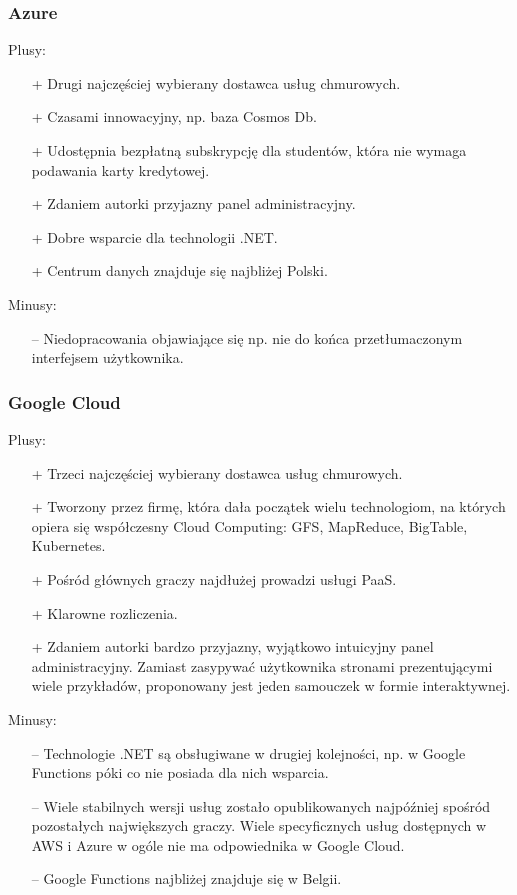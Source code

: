 \documentclass[12pt,a4paper,twoside,titlepage,openright]{book}
\begin{document}
\subsubsection{Azure}

Plusy:
\begin{itemize}
\item[+] Drugi najczęściej wybierany dostawca usług chmurowych.
\item[+] Czasami innowacyjny, np. baza Cosmos Db.
\item[+] Udostępnia bezpłatną subskrypcję dla studentów, która nie wymaga podawania karty kredytowej.
\item[+] Zdaniem autorki przyjazny panel administracyjny.
\item[+] Dobre wsparcie dla technologii .NET.
\item[+] Centrum danych znajduje się najbliżej Polski.
\end{itemize}

\noindent
Minusy:
\begin{itemize}
\item[--] Niedopracowania objawiające się np. nie do końca przetłumaczonym interfejsem użytkownika.
\end{itemize}

\subsubsection{Google Cloud}

Plusy:
\begin{itemize}
\item[+] Trzeci najczęściej wybierany dostawca usług chmurowych.
\item[+] Tworzony przez firmę, która dała początek wielu technologiom, na których opiera się współczesny Cloud Computing: GFS, MapReduce, BigTable, Kubernetes.
\item[+] Pośród głównych graczy najdłużej prowadzi usługi PaaS.
\item[+] Klarowne rozliczenia.
\item[+] Zdaniem autorki bardzo przyjazny, wyjątkowo intuicyjny panel administracyjny. Zamiast zasypywać użytkownika stronami prezentującymi wiele przykładów, proponowany jest jeden samouczek w formie interaktywnej.
\end{itemize}

\noindent
Minusy:
\begin{itemize}
\item[--] Technologie .NET są obsługiwane w drugiej kolejności, np. w Google Functions póki co nie posiada dla nich wsparcia.
\item[--] Wiele stabilnych wersji usług zostało opublikowanych najpóźniej spośród pozostałych największych graczy. Wiele specyficznych usług dostępnych w AWS i Azure w ogóle nie ma odpowiednika w Google Cloud.
\item[--] Google Functions najbliżej znajduje się w Belgii.
\end{itemize}
\end{document}
